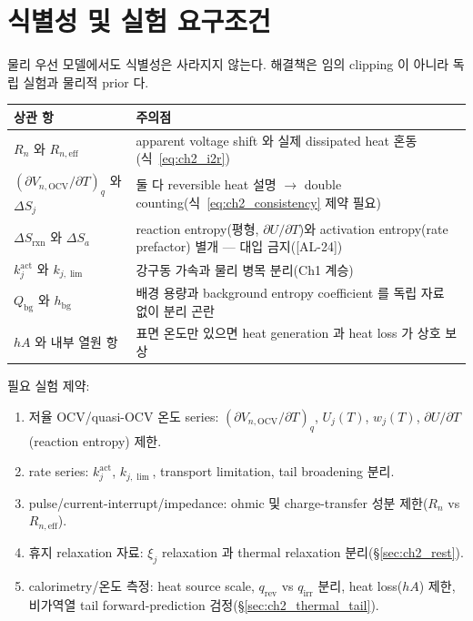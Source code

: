 \documentclass[11pt,a4paper]{article}
\newcommand{\eff}{\mathrm{eff}}
\newcommand{\bg}{\mathrm{bg}}
\newcommand{\OCV}{\mathrm{OCV}}
\newcommand{\irr}{\mathrm{irr}}
\newcommand{\rev}{\mathrm{rev}}
\newcommand{\rxn}{\mathrm{rxn}}
\newcommand{\AL}[1]{\textsf{[AL-#1]}}
\begin{document}
\section{식별성 및 실험 요구조건}\label{sec:ch2_ident}
물리 우선 모델에서도 식별성은 사라지지 않는다. 해결책은 임의 clipping 이 아니라 독립 실험과 물리적 prior 다.
\begin{longtable}{p{} p{}}
\toprule 상관 항 & 주의점 \\ \midrule \endhead
$R_n$ 와 $R_{n,\eff}$ & apparent voltage shift 와 실제 dissipated heat 혼동(식~\eqref{eq:ch2_i2r}) \\
$(\partial V_{n,\OCV}/\partial T)_q$ 와 $\Delta S_j$ & 둘 다 reversible heat 설명 $\to$ double counting(식~\eqref{eq:ch2_consistency} 제약 필요) \\
$\Delta S_{\rxn}$ 와 $\Delta S_a$ & reaction entropy(평형, $\partial U/\partial T$)와 activation entropy(rate prefactor) 별개 — 대입 금지(\AL{24}) \\
$k_j^{\mathrm{act}}$ 와 $k_{j,\lim}$ & 강구동 가속과 물리 병목 분리(Ch1 계승) \\
$Q_\bg$ 와 $h_\bg$ & 배경 용량과 background entropy coefficient 를 독립 자료 없이 분리 곤란 \\
$hA$ 와 내부 열원 항 & 표면 온도만 있으면 heat generation 과 heat loss 가 상호 보상 \\
\bottomrule
\end{longtable}
필요 실험 제약:
\begin{enumerate}[label=\arabic*),leftmargin=2.0em]
\item 저율 OCV/quasi-OCV 온도 series: $(\partial V_{n,\OCV}/\partial T)_q$, $U_j(T)$, $w_j(T)$, $\partial U/\partial T$(reaction entropy) 제한.
\item rate series: $k_j^{\mathrm{act}}$, $k_{j,\lim}$, transport limitation, tail broadening 분리.
\item pulse/current-interrupt/impedance: ohmic 및 charge-transfer 성분 제한($R_n$ vs $R_{n,\eff}$).
\item 휴지 relaxation 자료: $\xi_j$ relaxation 과 thermal relaxation 분리(\S\ref{sec:ch2_rest}).
\item calorimetry/온도 측정: heat source scale, $q_\rev$ vs $q_\irr$ 분리, heat loss($hA$) 제한, 비가역열 tail forward-prediction 검정(\S\ref{sec:ch2_thermal_tail}).
\end{enumerate}

\end{document}

